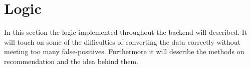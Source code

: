 \section{Logic}
\label{sec:logic}

In this section the logic implemented throughout the backend will described. It will touch on some of the difficulties of converting the data correctly without meeting too many false-positives. Furthermore it will describe the methods on recommendation and the idea behind them.


